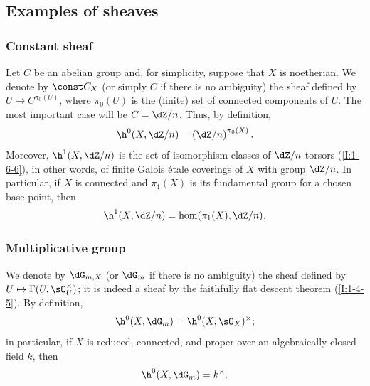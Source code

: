 \documentclass[oneside]{book}
\begin{document}
\subsection{Examples of sheaves}\label{I:2-2}

\subsubsection{Constant sheaf}\label{I:2-2-1}

Let $C$ be an abelian group and, for simplicity, suppose that $X$ is
noetherian. We denote by $\const C_X$ (or simply $C$ if there is no
ambiguity) the sheaf defined by $U\mapsto C^{\pi_0(U)}$, where
$\pi_0(U)$ is the (finite) set of connected components of $U$. The most
important case will be $C=\dZ/n$. Thus, by definition,
\[
  \h^0(X,\dZ/n)=\left(\dZ/n\right)^{\pi_0(X)}\text{.}
\]
Moreover, $\h^1(X,\dZ/n)$ is the set of isomorphism classes of
$\dZ/n$-torsors (\ref{I:1-6-6}), in other words, of finite Galois étale
coverings of $X$ with group $\dZ/n$. In particular, if $X$ is connected
and $\pi_1(X)$ is its fundamental group for a chosen base point, then
\[
  \h^1(X,\dZ/n) = \hom(\pi_1(X),\dZ/n)\text{.}
\]

\subsubsection{Multiplicative group}\label{I:2-2-2}

We denote by $\dG_{m,X}$ (or $\dG_m$ if there is no ambiguity) the sheaf
defined by $U\mapsto\Gamma(U,\sO_U^\times)$; it is indeed a sheaf by the
faithfully flat descent theorem (\ref{I:1-4-5}). By definition,
\[
  \h^0(X,\dG_m) = \h^0(X,\sO_X)^\times\text{;}
\]
in particular, if $X$ is reduced, connected, and proper over an
algebraically closed field $k$, then
\[
  \h^0(X,\dG_m) = k^\times\text{.}
\]
\end{document}
